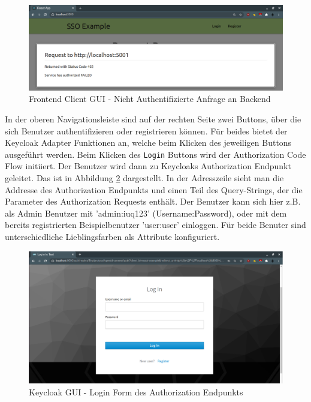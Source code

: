 \begin{figure}[!ht]
	\centering
	\includegraphics[width=1\textwidth]{Images/EbertScherer/FrontendLoggedOutBackendRequest.PNG}
	\caption{Frontend Client GUI - Nicht Authentifizierte Anfrage an Backend}
	\label{fig:EB_Nicht Authentifizierte Anfrage an Backend}
\end{figure}

In der oberen Navigationsleiste sind auf der rechten Seite zwei Buttons, über die sich Benutzer authentifizieren oder registrieren können. Für beides bietet der Keycloak Adapter Funktionen an, welche beim Klicken des jeweiligen Buttons ausgeführt werden. Beim Klicken des \texttt{Login} Buttons wird der Authorization Code Flow initiiert. Der Benutzer wird dann zu Keycloaks Authorization Endpunkt geleitet. Das ist in Abbildung \ref{fig:EB_Login Form des Authorization Endpunkts} dargestellt. In der Adresszeile sieht man die Addresse des Authorization Endpunkts und einen Teil des Query-Strings, der die Parameter des Authorization Requests enthält. Der Benutzer kann sich hier z.B. als Admin Benutzer mit 'admin:iuq123' (Username:Password), oder mit dem bereits registrierten Beispielbenutzer 'user:user' einloggen. Für beide Benuter sind unterschiedliche Lieblingsfarben als Attribute konfiguriert.

\begin{figure}[!ht]
	\centering
	\includegraphics[width=1\textwidth]{Images/EbertScherer/FrontendLoginForm.PNG}
	\caption{Keycloak GUI - Login Form des Authorization Endpunkts}
	\label{fig:EB_Login Form des Authorization Endpunkts}
\end{figure}

